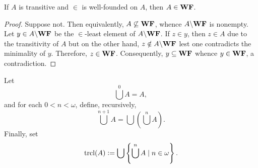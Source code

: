 \begin{lemma}
    If $A$ is transitive and $\in$ is well-founded on $A$, then $A\in\mathbf{WF}$.
\end{lemma}
\begin{proof}
    Suppose not. Then equivalently, $A\not\subseteq\mathbf{WF}$, whence $A\backslash\mathbf{WF}$ is nonempty. Let $y\in A\backslash\mathbf{WF}$ be the $\in$-least element of $A\backslash\mathbf{WF}$. If $z\in y$, then $z\in A$ due to the transitivity of $A$ but on the other hand, $z\notin A\backslash\mathbf{WF}$ lest one contradicts the minimality of $y$. Therefore, $z\in\mathbf{WF}$. Consequently, $y\subseteq\mathbf{WF}$ whence $y\in\mathbf{WF}$, a contradiction.
\end{proof}

\begin{definition}
    Let 
    \begin{equation*}
        \bigcup^0 A = A,
    \end{equation*}
    and for each $0 < n < \omega$, define, recursively, 
    \begin{equation*}
        \bigcup^{n + 1} A = \bigcup\left(\bigcup^n A\right).
    \end{equation*}
    Finally, set 
    \begin{equation*}
        \operatorname{tr cl}(A) := \bigcup\left\{\bigcup^n A\mid n\in\omega\right\}.
    \end{equation*}
\end{definition}

